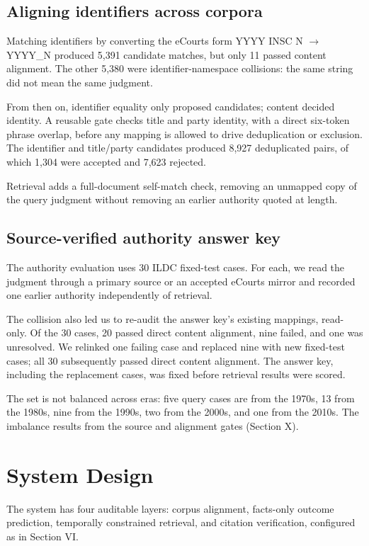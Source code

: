 \documentclass[conference]{IEEEtran}
\begin{document}
\subsection{Aligning identifiers across corpora}
Matching identifiers by converting the eCourts form YYYY INSC N $\rightarrow$ YYYY\_N produced 5,391 candidate matches, but only 11 passed content alignment. The other 5,380 were identifier-namespace collisions: the same string did not mean the same judgment.

From then on, identifier equality only proposed candidates; content decided identity. A reusable gate checks title and party identity, with a direct six-token phrase overlap, before any mapping is allowed to drive deduplication or exclusion. The identifier and title/party candidates produced 8,927 deduplicated pairs, of which 1,304 were accepted and 7,623 rejected.

Retrieval adds a full-document self-match check, removing an unmapped copy of the query judgment without removing an earlier authority quoted at length.

\subsection{Source-verified authority answer key}
The authority evaluation uses 30 ILDC fixed-test cases. For each, we read the judgment through a primary source or an accepted eCourts mirror and recorded one earlier authority independently of retrieval.

The collision also led us to re-audit the answer key's existing mappings, read-only. Of the 30 cases, 20 passed direct content alignment, nine failed, and one was unresolved. We relinked one failing case and replaced nine with new fixed-test cases; all 30 subsequently passed direct content alignment. The answer key, including the replacement cases, was fixed before retrieval results were scored.

The set is not balanced across eras: five query cases are from the 1970s, 13 from the 1980s, nine from the 1990s, two from the 2000s, and one from the 2010s. The imbalance results from the source and alignment gates (Section X).

\section{System Design}
The system has four auditable layers: corpus alignment, facts-only outcome prediction, temporally constrained retrieval, and citation verification, configured as in Section VI.
\end{document}
